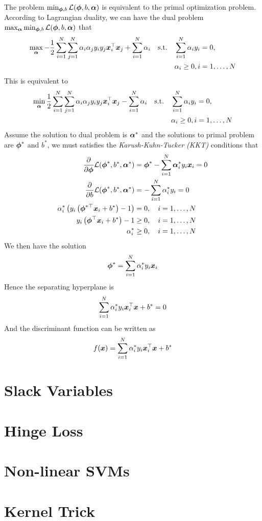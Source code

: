 The problem $\min_{\boldsymbol{\phi},b}\mathcal{L}(\boldsymbol{\phi},b,\boldsymbol{\alpha})$ is equivalent to the primal optimization problem. According to Lagrangian duality, we can have the dual problem $\max_{\boldsymbol{\alpha}}\min_{\boldsymbol{\phi},b}\mathcal{L}(\boldsymbol{\phi},b,\boldsymbol{\alpha})$ that
\begin{align*}
	\max_{\boldsymbol{\alpha}}-\frac{1}{2}\sum_{i=1}^N\sum_{j=1}^N\alpha_i\alpha_jy_iy_j\boldsymbol{x}_i^\top\boldsymbol{x}_j+\sum_{i=1}^N\alpha_i\quad\text{s.t.}\quad&\sum_{i=1}^N\alpha_iy_i=0, \\
	&\alpha_i\geq 0,i=1,\dotsc,N
\end{align*}
This is equivalent to
\begin{align*}
	\min_{\boldsymbol{\alpha}}\frac{1}{2}\sum_{i=1}^N\sum_{j=1}^N\alpha_i\alpha_jy_iy_j\boldsymbol{x}_i^\top\boldsymbol{x}_j-\sum_{i=1}^N\alpha_i\quad\text{s.t.}\quad&\sum_{i=1}^N\alpha_iy_i=0, \\
	&\alpha_i\geq 0,i=1,\dotsc,N
\end{align*}
Assume the solution to dual problem is $\boldsymbol{\alpha}^*$ and the solutions to primal problem are $\boldsymbol{\phi}^*$ and $b^*$, we must satisfies the \emph{Karush-Kuhn-Tucker (KKT)} conditions that
\begin{align*}
	\frac{\partial}{\partial\boldsymbol{\phi}}\mathcal{L}(\boldsymbol{\phi}^*,b^*,\boldsymbol{\alpha}^*)&=\boldsymbol{\phi}^*-\sum_{i=1}^N\boldsymbol{\alpha}_i^*y_i\boldsymbol{x}_i=0 \\
	\frac{\partial}{\partial b}\mathcal{L}(\boldsymbol{\phi}^*,b^*,\boldsymbol{\alpha}^*)&=-\sum_{i=1}^N\alpha_i^*y_i=0 \\
	\alpha_i^*\left(y_i\left(\boldsymbol{\phi}^*{}^\top\boldsymbol{x}_i+b^*\right)-1\right)&=0,\quad i=1,\dotsc,N \\
	y_i\left(\boldsymbol{\phi}{}^\top\boldsymbol{x}_i+b^*\right)-1&\geq 0,\quad i=1,\dotsc,N \\
	\alpha_i^*&\geq 0,\quad i=1,\dotsc,N
\end{align*}
We then have the solution
\begin{align*}
	\boldsymbol{\phi}^*=\sum_{i=1}^N\alpha_i^*y_i\boldsymbol{x}_i
\end{align*}
Hence the separating hyperplane is
\begin{align*}
	\sum_{i=1}^N\alpha_i^*y_i\boldsymbol{x}_i^\top\boldsymbol{x}+b^*=0
\end{align*}
And the discriminant function can be written as
\begin{align*}
	f(\boldsymbol{x})=\sum_{i=1}^N\alpha_i^*y_i\boldsymbol{x}_i^\top\boldsymbol{x}+b^*
\end{align*}



\section{Slack Variables}

\section{Hinge Loss}

\section{Non-linear SVMs}

\section{Kernel Trick}